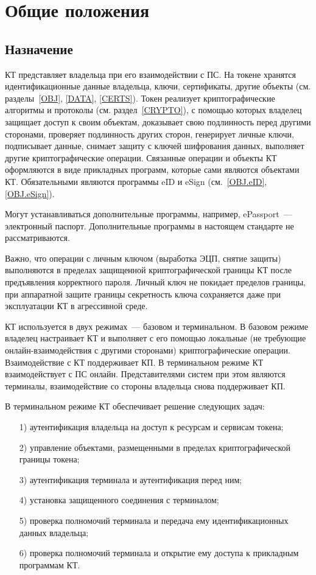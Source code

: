 \chapter{Общие положения}\label{COMMON}

\section{Назначение}

КТ представляет владельца при его взаимодействии с ПС.
На токене хранятся идентификационные данные владельца, ключи, сертификаты, 
другие объекты (см. разделы~\ref{OBJ}, \ref{DATA}, \ref{CERTS}). 
%
Токен реализует криптографические алгоритмы и протоколы (см. раздел~\ref{CRYPTO}), 
с помощью которых владелец защищает доступ к своим объектам, 
доказывает свою подлинность перед другими сторонами, 
проверяет подлинность других сторон, генерирует личные ключи, подписывает 
данные, снимает защиту с ключей шифрования данных, выполняет другие 
криптографические операции.
%
Связанные операции и объекты КТ оформляются в виде прикладных программ,
которые сами являются объектами КТ. Обязательными являются 
программы eID и eSign (см.~\ref{OBJ.eID}, \ref{OBJ.eSign}).

Могут устанавливаться дополнительные программы, например, ePassport~--- 
электронный паспорт. Дополнительные программы в настоящем стандарте не 
рассматриваются.
\fi

Важно, что операции с личным ключом (выработка ЭЦП, снятие защиты) выполняются  
в пределах защищенной криптографической границы КТ после предъявления 
корректного пароля. Личный ключ не покидает пределов границы, при аппаратной 
защите границы секретность ключа сохраняется даже при эксплуатации КТ в 
агрессивной среде.

КТ используется в двух режимах~--- базовом и терминальном.
%
В базовом режиме владелец настраивает КТ и выполняет с его помощью 
локальные (не требующие онлайн-взаимодействия с другими сторонами) 
криптографические операции. Взаимодействие с КТ поддерживает КП. 
%
В терминальном режиме КТ взаимодействует с ПС онлайн. Представителями систем 
при этом являются терминалы, взаимодействие со стороны владельца снова 
поддерживает КП.

В терминальном режиме КТ обеспечивает решение следующих задач: 
\begin{enumerate}
\item[1)]
аутентификация владельца на доступ к ресурсам и сервисам токена; 
\item[2)]
управление объектами, размещенными в пределах криптографической границы токена;
\item[3)]
аутентификация терминала и аутентификация перед ним;
\item[4)]
установка защищенного соединения с терминалом;
\item[5)]
проверка полномочий терминала и передача ему идентификационных данных владельца;
\item[6)]
проверка полномочий терминала и открытие ему доступа к прикладным программам КТ. 
\end{enumerate}

